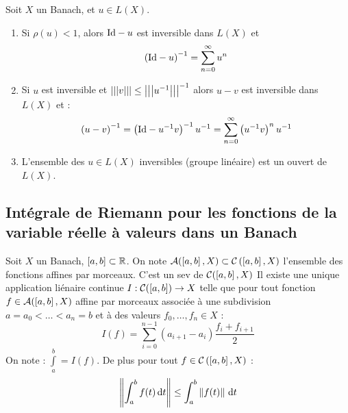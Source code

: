 \documentclass{cours}
\begin{document}
\begin{theorem}
    Soit $X$ un Banach, et $u \in L(X)$.
    \begin{enumerate}
        \item Si $\rho(u) < 1$, alors $\mathrm{Id} - u$ est inversible dans $L(X)$ et \[\left(\mathrm{Id} - u\right)^{-1} = \sum_{n = 0}^{\infty} u^{n}\]
        \item Si $u$ est inversible et $\left| \left| \left| v \right| \right| \right| \leq \left| \left| \left| u^{-1} \right| \right| \right|^{-1}$ alors $u - v$ est inversible dans $L(X)$ et : \[\left(u - v\right)^{-1} = \left(\mathrm{Id} - u^{-1}v\right)^{-1}u^{-1} = \sum_{n = 0}^{\infty}\left(u^{-1}v\right)^{n}u^{-1}\]
        \item L'ensemble des $u \in L(X)$ inversibles (groupe linéaire) est un ouvert de $L(X)$.
    \end{enumerate}
\end{theorem}

\subsection{Intégrale de Riemann pour les fonctions de la variable réelle à valeurs dans un Banach}
\begin{theorem}
    Soit $X$ un Banach, $\left[a, b\right] \subset \mathbb{R}$. On note $\mathcal{A}(\left[a, b\right], X) \subset \mathcal{C}\left(\left[a, b\right], X\right)$ l'ensemble des fonctions affines par morceaux. C'est un sev de $\mathcal{C}(\left[a, b\right], X)$
    Il existe une unique application liénaire continue $I : \mathcal{C}(\left[a, b\right]) \rightarrow X$ telle que pour tout fonction $f \in \mathcal{A}(\left[a, b\right], X)$ affine par morceaux associée à une subdivision $a = a_{0} < \ldots < a_{n} = b$ et à des valeurs $f_{0}, \ldots, f_{n} \in X$ :
    \[
        I(f) = \sum_{i = 0}^{n - 1}(a_{i + 1} - a_{i})\frac{f_{i} + f_{i + 1}}{2}
    \]
    On note : $\int\limits_{a}^{b} = I(f)$. De plus pour tout $f \in \mathcal{C}\left(\left[a, b\right], X\right)$ :
    \[
        \left\lVert \int_{a}^{b} f(t) {\rm \, d} t \right\rVert \leq \int_{a}^{b}\left\lVert f(t) \right\rVert{\rm \, d} t
    \]
\end{theorem}
\end{document}
